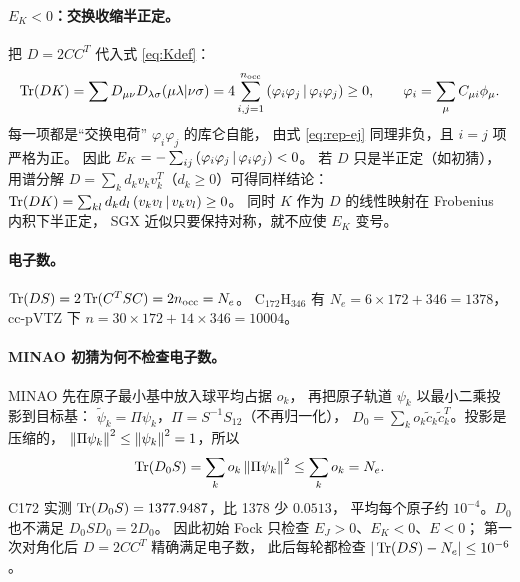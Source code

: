 \paragraph{\(E_K<0\)：交换收缩半正定。}
把 \(D=2CC^T\) 代入式 \eqref{eq:Kdef}：
\begin{equation}
\operatorname{Tr}(DK)=\sum D_{\mu\nu}D_{\lambda\sigma}(\mu\lambda|\nu\sigma)
=4\sum_{i,j=1}^{n_{\mathrm{occ}}}
\left(\varphi_i\varphi_j\,\middle|\,\varphi_i\varphi_j\right)\geq0,
\qquad \varphi_i=\sum_\mu C_{\mu i}\phi_\mu .
\label{eq:rep-ek}
\end{equation}
每一项都是“交换电荷” \(\varphi_i\varphi_j\) 的库仑自能，
由式 \eqref{eq:rep-ej} 同理非负，且 \(i=j\) 项严格为正。
因此 \(E_K=-\sum_{ij}\left(\varphi_i\varphi_j\,\middle|\,\varphi_i\varphi_j\right)<0\)。
若 \(D\) 只是半正定（如初猜），用谱分解
\(D=\sum_kd_kv_kv_k^T\)（\(d_k\geq0\)）可得同样结论：
\(\operatorname{Tr}(DK)=\sum_{kl}d_kd_l\left(v_kv_l\,\middle|\,v_kv_l\right)\geq0\)。
同时 \(K\) 作为 \(D\) 的线性映射在 Frobenius 内积下半正定，
SGX 近似只要保持对称，就不应使 \(E_K\) 变号。

\paragraph{电子数。}
\(\operatorname{Tr}(DS)=2\operatorname{Tr}(C^TSC)=2n_{\mathrm{occ}}=N_e\)。
C\(_{172}\)H\(_{346}\) 有 \(N_e=6\times172+346=1378\)，
cc-pVTZ 下 \(n=30\times172+14\times346=10004\)。

\paragraph{MINAO 初猜为何不检查电子数。}
MINAO 先在原子最小基中放入球平均占据 \(o_k\)，
再把原子轨道 \(\psi_k\) 以最小二乘投影到目标基：
\(\tilde\psi_k=\Pi\psi_k\)，\(\Pi=S^{-1}S_{12}\)（不再归一化），
\(D_0=\sum_ko_k\tilde c_k\tilde c_k^T\)。投影是压缩的，
\(\left\lVert \Pi\psi_k\right\rVert^2\leq\left\lVert \psi_k\right\rVert^2=1\)，所以
\begin{equation}
\operatorname{Tr}(D_0S)=\sum_ko_k\left\lVert \Pi\psi_k\right\rVert^2\leq\sum_ko_k=N_e .
\end{equation}
C172 实测 \(\operatorname{Tr}(D_0S)=1377.9487\)，比 1378 少 \(0.0513\)，
平均每个原子约 \(10^{-4}\)。\(D_0\) 也不满足 \(D_0SD_0=2D_0\)。
因此初始 Fock 只检查 \(E_J>0\)、\(E_K<0\)、\(E<0\)；
第一次对角化后 \(D=2CC^T\) 精确满足电子数，
此后每轮都检查 \(|\operatorname{Tr}(DS)-N_e|\leq10^{-6}\)。

